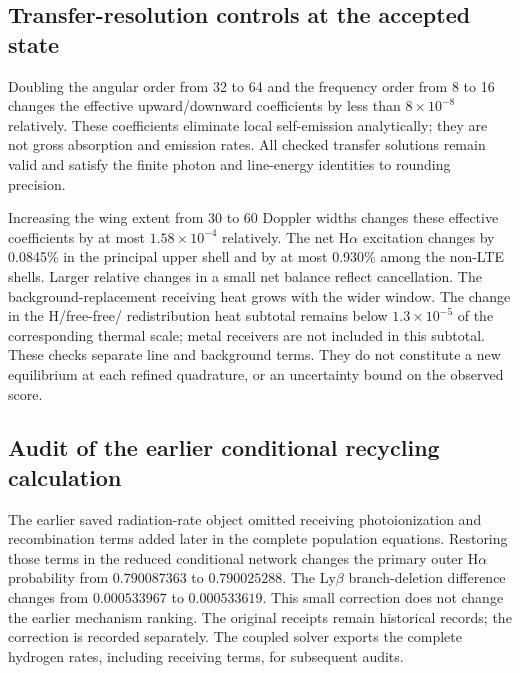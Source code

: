\subsection{Transfer-resolution controls at the accepted state}
Doubling the angular order from 32 to 64 and the frequency order from 8 to
16 changes the effective upward/downward coefficients by less than
$8\times10^{-8}$ relatively. These coefficients eliminate local
self-emission analytically; they are not gross absorption and emission
rates. All checked transfer solutions remain valid and satisfy the finite
photon and line-energy identities to rounding precision.

Increasing the wing extent from 30 to 60 Doppler widths changes these
effective coefficients by at most $1.58\times10^{-4}$ relatively.
The net H$\alpha$ excitation changes by 0.0845\% in the principal upper shell
and by at most 0.930\% among the non-LTE shells. Larger relative changes in
a small net balance reflect cancellation. The background-replacement
receiving heat grows with the wider window. The change in the H/free-free/
redistribution heat subtotal remains below $1.3\times10^{-5}$ of the
corresponding thermal scale; metal receivers are not included in this
subtotal. These checks separate line and background terms. They do not constitute a
new equilibrium at each refined quadrature, or an uncertainty bound on the
observed score.

\subsection{Audit of the earlier conditional recycling calculation}
The earlier saved radiation-rate object omitted receiving photoionization
and recombination terms added later in the complete population equations.
Restoring those terms in the reduced conditional network changes the primary
outer H$\alpha$ probability from $0.790087363$ to $0.790025288$.
The Ly$\beta$ branch-deletion difference changes from $0.000533967$ to
$0.000533619$. This small correction does not change the earlier mechanism
ranking. The original receipts remain historical records; the correction
is recorded separately. The coupled solver exports the complete hydrogen
rates, including receiving terms, for subsequent audits.
